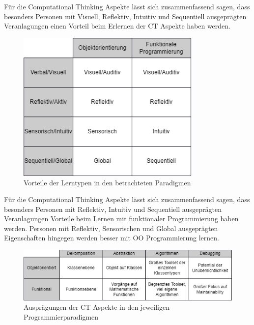 Für die Computational Thinking Aspekte lässt sich zusammenfassend sagen, dass besonders Personen mit Visuell, Reflektiv, Intuitiv und Sequentiell ausgeprägten Veranlagungen einen Vorteil beim Erlernen der CT Aspekte haben werden.

\begin{figure}[h!]
    \centering
    \includegraphics[width=1\linewidth]{Figures/Section_3/Styles_Paradigms}
    \caption{Vorteile der Lerntypen in den betrachteten Paradigmen}
\end{figure}

Für die Computational Thinking Aspekte lässt sich zusammenfassend sagen, dass besonders Personen mit Reflektiv, Intuitiv und Sequentiell ausgeprägten Veranlagungen Vorteile beim Lernen mit funktionaler Programmierung haben werden.
Personen mit Reflektiv, Sensorischen und Global ausgeprägten Eigenschaften hingegen werden besser mit OO Programmierung lernen.

\begin{figure}[h!]
    \centering
    \includegraphics[width=1\linewidth]{Figures/Section_3/CT_Paradigms}
    \caption{Ausprägungen der CT Aspekte in den jeweiligen Programmierparadigmen}
\end{figure}


